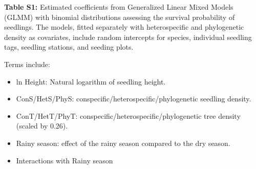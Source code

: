 \documentclass[
  12pt,
  letterpaper,
  DIV=11,
  numbers=noendperiod]{scrartcl}
\providecommand{\tightlist}{%
  \setlength{\itemsep}{0pt}\setlength{\parskip}{0pt}}\usepackage{longtable,booktabs,array}
\begin{document}
\newpage

\textbf{Table S1:} Estimated coefficients from Generalized Linear Mixed
Models (GLMM) with binomial distributions assessing the survival
probability of seedlings. The models, fitted separately with
heterospecific and phylogenetic density as covariates, include random
intercepts for species, individual seedling tags, seedling stations, and
seeding plots.

Terms include:

\begin{itemize}
\tightlist
\item
  ln Height: Natural logarithm of seedling height.
\item
  ConS/HetS/PhyS: conspecific/heterospecific/phylogenetic seedling
  density.
\item
  ConT/HetT/PhyT: conspecific/heterospecific/phylogenetic tree density
  (scaled by 0.26).
\item
  Rainy season: effect of the rainy season compared to the dry season.
\item
  Interactions with Rainy season
\end{itemize}
\end{document}
